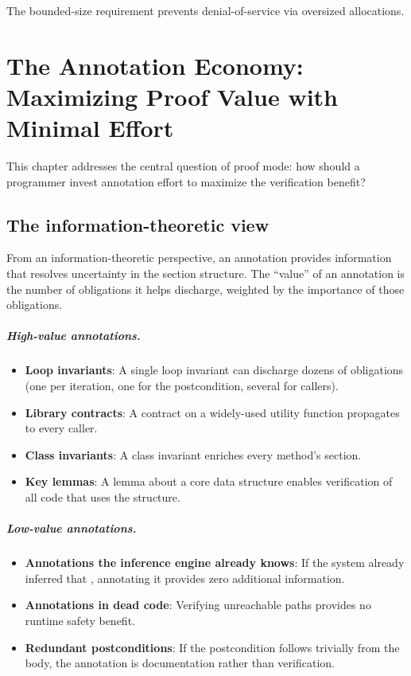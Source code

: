 \documentclass[11pt]{report}
\DeclareRobustCommand{\py}[1]{\texttt{\detokenize{#1}}}
\theoremstyle{definition}
\theoremstyle{plain}
\begin{document}
The bounded-size requirement prevents denial-of-service via oversized
allocations.


\chapter{The Annotation Economy: Maximizing Proof Value with Minimal Effort}

This chapter addresses the central question of proof mode: how should a
programmer invest annotation effort to maximize the verification benefit?

\section{The information-theoretic view}

From an information-theoretic perspective, an annotation provides information
that resolves uncertainty in the section structure. The ``value'' of an
annotation is the number of obligations it helps discharge, weighted by the
importance of those obligations.

\paragraph{High-value annotations.}
\begin{itemize}[nosep]
  \item \textbf{Loop invariants}: A single loop invariant can discharge
        dozens of obligations (one per iteration, one for the postcondition,
        several for callers).
  \item \textbf{Library contracts}: A contract on a widely-used utility
        function propagates to every caller.
  \item \textbf{Class invariants}: A class invariant enriches every method's
        section.
  \item \textbf{Key lemmas}: A lemma about a core data structure
        enables verification of all code that uses the structure.
\end{itemize}

\paragraph{Low-value annotations.}
\begin{itemize}[nosep]
  \item \textbf{Annotations the inference engine already knows}: If the
        system already inferred that \py{len(xs) > 0}, annotating it
        provides zero additional information.
  \item \textbf{Annotations in dead code}: Verifying unreachable paths
        provides no runtime safety benefit.
  \item \textbf{Redundant postconditions}: If the postcondition follows
        trivially from the body, the annotation is documentation rather
        than verification.
\end{itemize}
\end{document}
